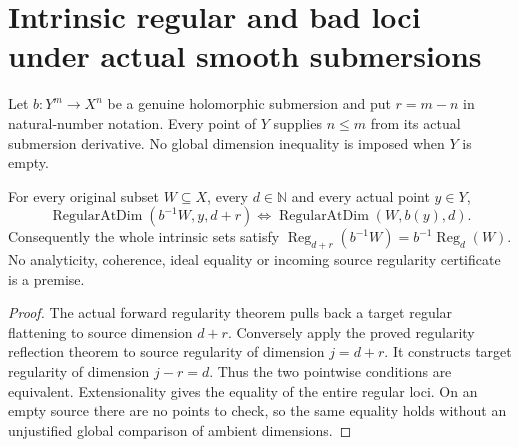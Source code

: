 \section{Intrinsic regular and bad loci under actual smooth submersions}

Let $b:Y^m\to X^n$ be a genuine holomorphic submersion and put
$r=m-n$ in natural-number notation.  Every point of $Y$ supplies
$n\leq m$ from its actual submersion derivative.  No global dimension
inequality is imposed when $Y$ is empty.

\begin{theorem}
\label{hir:original-smooth-intrinsic-regular-locus}
\leanok
For every original subset $W\subseteq X$, every $d\in\mathbb N$ and
every actual point $y\in Y$,
\[
 \operatorname{RegularAtDim}(b^{-1}W,y,d+r)
 \iff \operatorname{RegularAtDim}(W,b(y),d).
\]
Consequently the whole intrinsic sets satisfy
$\operatorname{Reg}_{d+r}(b^{-1}W)=b^{-1}\operatorname{Reg}_d(W)$.
No analyticity, coherence, ideal equality or incoming source regularity
certificate is a premise.
\end{theorem}
\begin{proof}
The actual forward regularity theorem pulls back a target regular
flattening to source dimension $d+r$.  Conversely apply the proved
regularity reflection theorem to source regularity of dimension
$j=d+r$.  It constructs target regularity of dimension $j-r=d$.
Thus the two pointwise conditions are equivalent.  Extensionality gives
the equality of the entire regular loci.  On an empty source there are
no points to check, so the same equality holds without an unjustified
global comparison of ambient dimensions.
\end{proof}

